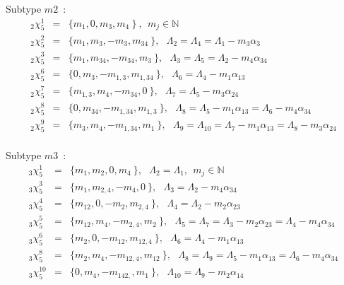 \documentclass[a4paper]{jpconf}
\def\bb {\begin {eqnarray}}
\def\eqnn#1{\bb\label{#1}}
\def\eea {\end {eqnarray}}
\def\nn{\nonumber}
\def\bbn{\mathbb{N}}%
\def\a{\alpha}
\def\L{\Lambda}
\begin{document}
Subtype $m2$~:
\eqnn{slt52}
_2\chi^1_5 &=& \{ m_1, 0, m_3, m_4 \   \} \ , ~~m_j \in\bbn  \\
_2\chi^2_5 &=& \{ m_1, m_{3}, -m_3, m_{34} \   \} , ~~~\L_2 = \L_4 = \L_1 - m_3 \a_3 \nn\\
_2\chi^3_5 &=& \{ m_{1}, m_{34}, -m_{34}, m_{3} \   \} , ~~~\L_3 = \L_5 = \L_2 - m_4 \a_{34} \nn\\
_2\chi^6_5 &=& \{ 0, m_{3}, -m_{1,3}, m_{1,34} \   \} , ~~~\L_6 = \L_4 - m_1 \a_{13} \nn\\
_2\chi^7_5 &=& \{ m_{1,3}, m_{4}, -m_{34}, 0 \   \} , ~~~\L_7 = \L_5 - m_3 \a_{24} \nn\\
_2\chi^8_5 &=& \{ 0, m_{34}, -m_{1,34}, m_{1,3} \   \} , ~~~\L_8 = \L_5 - m_1 \a_{13} = \L_6 - m_4 \a_{34}\nn\\
_2\chi^9_5 &=& \{ m_{3}, m_{4}, -m_{1,34}, m_{1} \   \} , ~~~\L_9 = \L_{10} = \L_7 - m_1 \a_{13} = \L_8 - m_3 \a_{24} \nn\\
\nn\eea


Subtype $m3$~:
\eqnn{slt53}
_3\chi^1_5 &=& \{ m_1, m_{2}, 0, m_{4} \   \} , ~~~\L_2 = \L_1, ~~m_j \in\bbn  \\
_3\chi^3_5 &=& \{ m_{1}, m_{2,4}, -m_{4}, 0 \   \} , ~~~\L_3 = \L_2 - m_4 \a_{34} \nn\\
_3\chi^4_5 &=& \{ m_{12}, 0, -m_{2}, m_{2,4} \   \} , ~~~\L_4 = \L_2 - m_2 \a_{23} \nn\\
_3\chi^5_5 &=& \{ m_{12}, m_{4}, -m_{2,4}, m_{2} \   \} , ~~~\L_5 = \L_7 =  \L_3 - m_2 \a_{23} = \L_4 - m_4 \a_{34} \nn\\
_3\chi^6_5 &=& \{ m_{2}, 0, -m_{12}, m_{12,4} \   \} , ~~~\L_6 = \L_4 - m_1 \a_{13} \nn\\
_3\chi^8_5 &=& \{ m_{2}, m_{4}, -m_{12,4}, m_{12} \   \} , ~~~\L_8 = \L_9 = \L_5 - m_1 \a_{13} = \L_6 - m_4 \a_{34}\nn\\
_3\chi^{10}_5 &=& \{ 0, m_{4}, -m_{142,}, m_{1} \   \} , ~~~\L_{10} = \L_9 - m_2 \a_{14} \nn\eea
\end{document}
